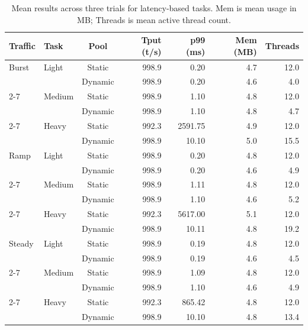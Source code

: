 \documentclass[sigconf, 10pt]{acmart}
\begin{document}
\begin{table}[htbp]
\centering
\footnotesize
\setlength{\tabcolsep}{3pt}
\begin{tabular}{llcrrrr}
\toprule
\textbf{Traffic} & \textbf{Task} & \textbf{Pool} & \textbf{Tput (t/s)} & \textbf{p99 (ms)} & \textbf{Mem (MB)} & \textbf{Threads} \\
\midrule
  Burst & Light & Static & 998.9 & 0.20 & 4.7 & 12.0 \\
        &       & Dynamic & 998.9 & 0.20 & 4.6 & 4.0 \\
\cmidrule{2-7}
        & Medium & Static & 998.9 & 1.10 & 4.8 & 12.0 \\
        &        & Dynamic & 998.9 & 1.10 & 4.8 & 4.7 \\
\cmidrule{2-7}
        & Heavy & Static & 992.3 & 2591.75 & 4.9 & 12.0 \\
        &       & Dynamic & 998.9 & 10.10 & 5.0 & 15.5 \\
\midrule
  Ramp  & Light & Static & 998.9 & 0.20 & 4.8 & 12.0 \\
        &       & Dynamic & 998.9 & 0.20 & 4.6 & 4.9 \\
\cmidrule{2-7}
        & Medium & Static & 998.9 & 1.11 & 4.8 & 12.0 \\
        &        & Dynamic & 998.9 & 1.10 & 4.6 & 5.2 \\
\cmidrule{2-7}
        & Heavy & Static & 992.3 & 5617.00 & 5.1 & 12.0 \\
        &       & Dynamic & 998.9 & 10.11 & 4.8 & 19.2 \\
\midrule
  Steady & Light & Static & 998.9 & 0.19 & 4.8 & 12.0 \\
         &       & Dynamic & 998.9 & 0.19 & 4.6 & 4.5 \\
\cmidrule{2-7}
         & Medium & Static & 998.9 & 1.09 & 4.8 & 12.0 \\
         &        & Dynamic & 998.9 & 1.10 & 4.6 & 4.9 \\
\cmidrule{2-7}
         & Heavy & Static & 992.3 & 865.42 & 4.8 & 12.0 \\
         &       & Dynamic & 998.9 & 10.10 & 4.8 & 13.4 \\
\bottomrule
\end{tabular}
\caption{Mean results across three trials for latency-based tasks. Mem is mean usage in MB; Threads is mean active thread count.}
\label{tab:latency_results}
\end{table}
\end{document}
